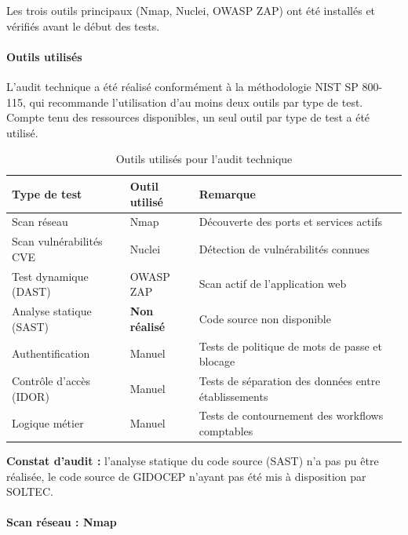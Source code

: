 \documentclass[12pt,a4paper,oneside]{report}
\begin{document}
Les trois outils principaux (Nmap, Nuclei, OWASP ZAP) ont été installés 
et vérifiés avant le début des tests.

\paragraph{Outils utilisés}

L'audit technique a été réalisé conformément à la méthodologie NIST SP 800-115, 
qui recommande l'utilisation d'au moins deux outils par type de test. 
Compte tenu des ressources disponibles, un seul outil par type de test 
a été utilisé.

\begin{table}[H]
	\centering\small
	\caption{Outils utilisés pour l'audit technique}
	\label{tab:outils_tech}
	\begin{tabularx}{\textwidth}{|p{4cm}|p{3.5cm}|X|}
		\hline
		\rowcolor{theadcolor}
		\color{white}\textbf{Type de test} &
		\color{white}\textbf{Outil utilisé} &
		\color{white}\textbf{Remarque} \\
		\hline
		Scan réseau & Nmap & Découverte des ports et services actifs \\
		\hline
		Scan vulnérabilités CVE & Nuclei & Détection de vulnérabilités connues \\
		\hline
		Test dynamique (DAST) & OWASP ZAP & Scan actif de l'application web \\
		\hline
		Analyse statique (SAST) & \textbf{Non réalisé} & Code source non disponible \\
		\hline
		Authentification & Manuel & Tests de politique de mots de passe et blocage \\
		\hline
		Contrôle d'accès (IDOR) & Manuel & Tests de séparation des données entre établissements \\
		\hline
		Logique métier & Manuel & Tests de contournement des workflows comptables \\
		\hline
	\end{tabularx}
\end{table}
\textbf{Constat d'audit :} l'analyse statique du code source (SAST) n'a pas 
pu être réalisée, le code source de GIDOCEP n'ayant pas été mis à disposition 
par SOLTEC.

\paragraph{Scan réseau : Nmap}

\end{document}
